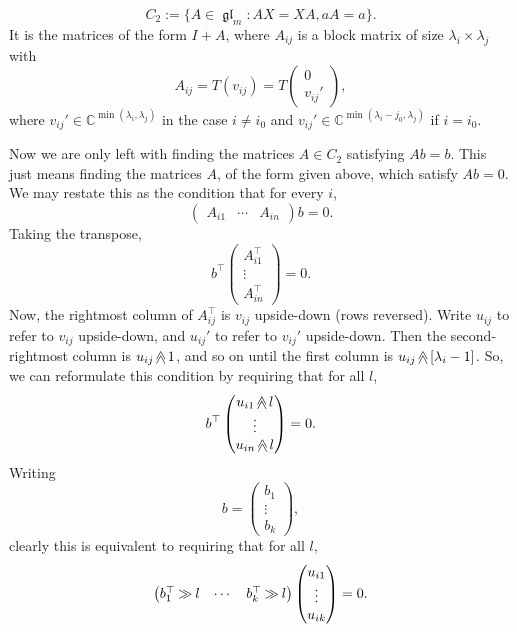 \documentclass[12pt,psamsfonts]{article}
\newcommand{\rightshift}{\mathbin{\rotatebox[origin=c]{180}{$\ll$}}}
\newcommand{\upshift}{\mathbin{\rotatebox[origin=c]{270}{$\ll$}}}
\DeclareMathOperator{\gl}{\mathfrak{gl}}
\begin{document}
\[C_2 := \{A \in \gl_m : AX = XA, aA = a\}.\]
It is the matrices of the form \(I + A\), where \(A_{ij}\) is a block matrix of size \(\lambda_i \times \lambda_j\) with 
\[A_{ij} = T(v_{ij}) = T\begin{pmatrix}
    0\\
    v_{ij}'
\end{pmatrix},\]
where \(v_{ij}' \in \mathbb{C}^{\min(\lambda_i, \lambda_j)}\) in the case \(i \neq i_0\) and \(v_{ij}' \in \mathbb{C}^{\min(\lambda_i - j_0, \lambda_j)}\) if \(i = i_0\).
\par Now we are only left with finding the matrices \(A \in C_2\) satisfying \(Ab = b\).
This just means finding the matrices \(A\), of the form given above, which satisfy \(Ab = 0\).
We may restate this as the condition that for every \(i\),
\[\begin{pmatrix}
    A_{i1} & \cdots & A_{in}
\end{pmatrix}b = 0.\]
Taking the transpose, 
\[b^\top \begin{pmatrix}
    A_{i1}^\top\\
    \vdots\\
    A_{in}^\top
\end{pmatrix} = 0.\]
Now, the rightmost column of \(A_{ij}^\top\) is \(v_{ij}\) upside-down (rows reversed).
Write \(u_{ij}\) to refer to \(v_{ij}\) upside-down, and \(u_{ij}'\) to refer to \(v_{ij}'\) upside-down.
Then the second-rightmost column is \(u_{ij} \upshift 1\), and so on until the first column is \(u_{ij} \upshift [\lambda_i - 1]\).
So, we can reformulate this condition by requiring that for all \(l\),
\[b^\top \begin{pmatrix}
    u_{i1} \upshift l\\
    \vdots\\
    u_{in} \upshift l
\end{pmatrix} = 0.\]
Writing
\[b = \begin{pmatrix}
    b_1\\
    \vdots\\
    b_k
\end{pmatrix},\]
clearly this is equivalent to requiring that for all \(l\),
\[\begin{pmatrix}
    b_1^\top \rightshift l & \cdots & b_k^\top \rightshift l
\end{pmatrix} \begin{pmatrix}
    u_{i1}\\
    \vdots\\
    u_{ik}
\end{pmatrix} = 0.\]
\end{document}

